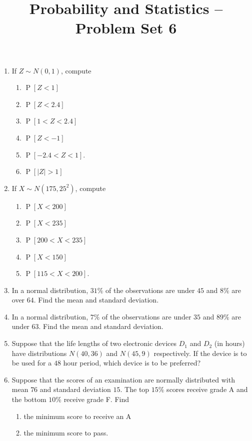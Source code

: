 \documentclass[svgnames]{amsart}
\title[]{Probability and Statistics -- Problem Set 6}
\DeclareMathOperator{\Prob}{P}
\begin{document}
\maketitle
\begin{enumerate}[leftmargin=*, itemsep=0.3em]
\item If $Z \sim N(0,1)$, compute
\begin{enumerate}
	\item $\Prob[Z < 1]$
	\item $\Prob[Z < 2.4]$
	\item $\Prob[1 < Z < 2.4]$
	\item $\Prob[Z < -1]$
	\item $\Prob[-2.4 < Z < 1]$.
	\item $\Prob[|Z| > 1]$
\end{enumerate}

\item If $X \sim N(175, 25^2)$, compute
\begin{enumerate}
	\item $\Prob[X < 200]$
	\item $\Prob[X < 235]$
	\item $\Prob[200 < X < 235]$
	\item $\Prob[X < 150]$
	\item $\Prob[115 < X < 200]$.
\end{enumerate}

\item In a normal distribution, $31\%$ of the observations are under $45$ and $8\%$ are over $64$. Find the mean and standard deviation.

\item In a normal distribution, $7\%$ of the observations are under $35$ and $89\%$ are under $63$. Find the mean and standard deviation.

\item Suppose that the life lengths of two electronic devices $D_1$ and $D_2$ (in hours) have distributions $N(40, 36)$ and $N(45, 9)$ respectively. If the device is to be used for a $48$ hour period, which device is to be preferred?

\item Suppose that the scores of an examination are normally distributed with mean $76$ and standard deviation $15$. The top $15\%$ scores receive grade A and the bottom $10\%$ receive grade F. Find
\begin{enumerate}
	\item the minimum score to receive an A
	\item the minimum score to pass.
\end{enumerate}


\end{enumerate}
\end{document}
